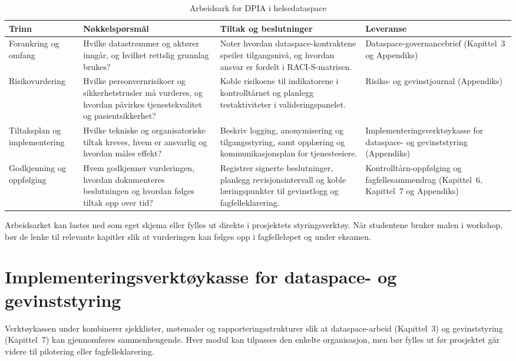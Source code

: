 \begin{table}[htbp]
    \centering
    \caption{Arbeidsark for DPIA i helsedataspace}
    \label{tab:appendiks-dpia}
    \begin{tabular}{p{3.0cm}p{5.0cm}p{5.0cm}p{2.8cm}}
        \toprule
        \textbf{Trinn} & \textbf{Nøkkelspørsmål} & \textbf{Tiltak og beslutninger} & \textbf{Leveranse} \\
        \midrule
        Forankring og omfang & Hvilke datastrømmer og aktører inngår, og hvilket rettslig grunnlag brukes? & Noter hvordan dataspace-kontraktene speiler tilgangsnivå, og hvordan ansvar er fordelt i RACI-S-matrisen. & Dataspace-governancebrief (Kapittel~3 og Appendiks) \\
        \addlinespace
        Risikovurdering & Hvilke personvernrisikoer og sikkerhetstrusler må vurderes, og hvordan påvirkes tjenestekvalitet og pasientsikkerhet? & Koble risikoene til indikatorene i kontrolltårnet og planlegg testaktiviteter i valideringspanelet. & Risiko- og gevinstjournal (Appendiks) \\
        \addlinespace
        Tiltaksplan og implementering & Hvilke tekniske og organisatoriske tiltak kreves, hvem er ansvarlig og hvordan måles effekt? & Beskriv logging, anonymisering og tilgangsstyring, samt opplæring og kommunikasjonsplan for tjenesteeiere. & Implementeringsverktøykasse for dataspace- og gevinststyring (Appendiks) \\
        \addlinespace
        Godkjenning og oppfølging & Hvem godkjenner vurderingen, hvordan dokumenteres beslutningen og hvordan følges tiltak opp over tid? & Registrer signerte beslutninger, planlegg revisjonsintervall og koble læringspunkter til gevinstlogg og fagfelleklarering. & Kontrolltårn-oppfølging og fagfellesammendrag (Kapittel~6, Kapittel~7 og Appendiks) \\
        \bottomrule
    \end{tabular}
\end{table}

Arbeidsarket kan lastes ned som eget skjema eller fylles ut direkte i prosjektets styringsverktøy.
Når studentene bruker malen i workshop, bør de lenke til relevante kapitler slik at vurderingen
kan følges opp i fagfelleløpet og under eksamen.

\section{Implementeringsverktøykasse for dataspace- og gevinststyring}
Verktøykassen under kombinerer sjekklister, møtemaler og rapporteringsstrukturer slik at
dataspace-arbeid (Kapittel~3) og gevinststyring (Kapittel~7) kan gjennomføres sammenhengende.
Hver modul kan tilpasses den enkelte organisasjon, men bør fylles ut før prosjektet går videre til
pilotering eller fagfelleklarering.

